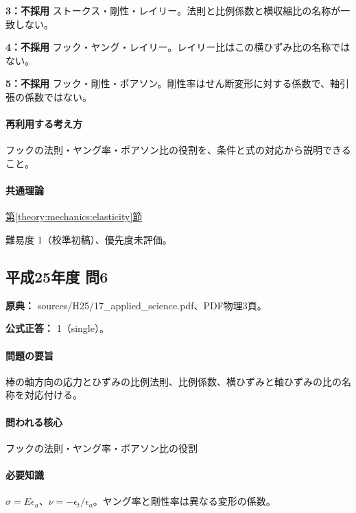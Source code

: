 \noindent\textbf{3：不採用} ストークス・剛性・レイリー。法則と比例係数と横収縮比の名称が一致しない。\par

\noindent\textbf{4：不採用} フック・ヤング・レイリー。レイリー比はこの横ひずみ比の名称ではない。\par

\noindent\textbf{5：不採用} フック・剛性・ポアソン。剛性率はせん断変形に対する係数で、軸引張の係数ではない。\par

\paragraph{再利用する考え方} フックの法則・ヤング率・ポアソン比の役割を、条件と式の対応から説明できること。

\paragraph{共通理論} \hyperref[theory:mechanics:elasticity]{第\ref*{theory:mechanics:elasticity}節}

\par 難易度 1（校準初稿）、優先度未評価。

\subsection{平成25年度 問6}
\label{q:h25-reg-applied-06}

\noindent\textbf{原典：} sources/H25/17\_applied\_science.pdf、PDF物理3頁。

\textbf{公式正答：} 1（single）。

\paragraph{問題の要旨} 棒の軸方向の応力とひずみの比例法則、比例係数、横ひずみと軸ひずみの比の名称を対応付ける。

\paragraph{問われる核心} フックの法則・ヤング率・ポアソン比の役割

\paragraph{必要知識} \(\sigma=E\epsilon_a\)、\(\nu=-\epsilon_t/\epsilon_a\)。ヤング率と剛性率は異なる変形の係数。

